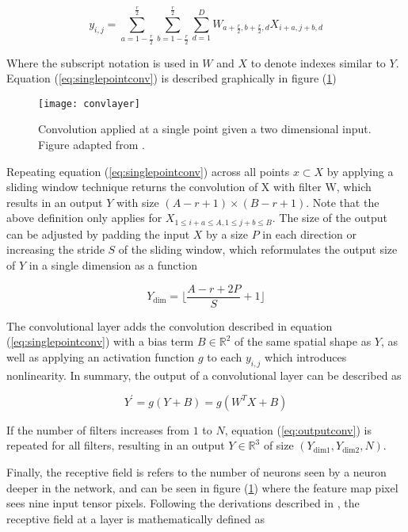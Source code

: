 \documentclass[../main/thesis.tex]{subfiles}
\begin{document}
\begin{equation}
    \label{eq:singlepointconv}
    y_{i,j} = \sum_{a=1-\frac{r}{2}}^\frac{r}{2} \sum_{b=1-\frac{r}{2}}^\frac{r}{2} \sum_{d=1}^D W_{a + \frac{r}{2},b + \frac{r}{2}, d} X_{i+a,j+b,d}
\end{equation}

Where the subscript notation is used in $W$ and $X$ to denote indexes similar to $Y$. Equation (\ref{eq:singlepointconv}) is described graphically in figure (\ref{fig:convlayer})

\begin{figure}
    \centering
    \texttt{[image: convlayer]}
    \caption{\label{fig:convlayer}Convolution applied at a single point given a two dimensional input. Figure adapted from \protect\citep{Yamashita2018}.}
\end{figure}

Repeating equation (\ref{eq:singlepointconv}) across all points $x \subset X$ by applying a sliding window technique returns the convolution of X with filter W, which results in an output $Y$ with size $(A-r+1) \times (B-r+1)$. Note that the above definition only applies for $X_{1 \leq i+a \leq A, 1 \leq j+b \leq B}$. The size of the output can be adjusted by padding the input $X$ by a size $P$ in each direction or increasing the stride $S$ of the sliding window, which reformulates the output size of $Y$ in a single dimension as a function

\begin{equation}
    \label{eq:outputdim}
    Y_\text{dim} = \lfloor\frac{A - r + 2P}{S} + 1\rfloor    
\end{equation}

The convolutional layer adds the convolution described in equation (\ref{eq:singlepointconv}) with a bias term $B \in{\mathbb{R}^2}$ of the same spatial shape as $Y$, as well as applying an activation function $g$ to each $y_{i,j}$ which introduces nonlinearity. In summary, the output of a convolutional layer can be described as 

\begin{equation}
    \label{eq:outputconv}
    Y^\prime = g(Y + B) = g(W^TX + B)
\end{equation}

If the number of filters increases from $1$ to $N$, equation (\ref{eq:outputconv}) is repeated for all filters, resulting in an output $Y \in{\mathbb{R}^3}$ of size $(Y_\text{dim1}, Y_\text{dim2}, N)$.

Finally, the receptive field is refers to the number of neurons seen by a neuron deeper in the network, and can be seen in figure (\ref{fig:convlayer}) where the feature map pixel sees nine input tensor pixels. Following the derivations described in \citet{Araujo2019}, the receptive field at a layer is mathematically defined as
\end{document}
